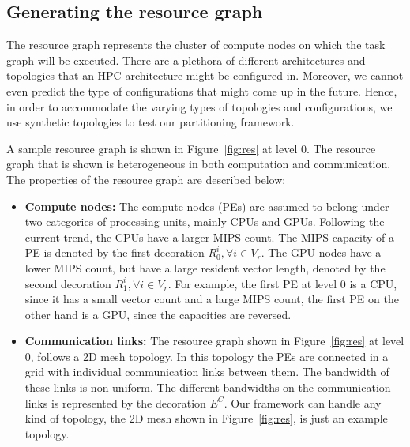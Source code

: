 \subsection{Generating the resource graph}
\label{sec:gener-reso-graph}

The resource graph represents the cluster of compute nodes on which the
task graph will be executed. There are a plethora of different
architectures and topologies that an HPC architecture might be
configured in. Moreover, we cannot even predict the type of
configurations that might come up in the future. Hence, in order to
accommodate the varying types of topologies and configurations, we use
synthetic topologies to test our partitioning framework.

A sample resource graph is shown in Figure~\ref{fig:res} at level 0. The
resource graph that is shown is heterogeneous in both computation and
communication. The properties of the resource graph are described below:

\begin{itemize}

\item \textbf{Compute nodes:} The compute nodes (PEs) are assumed to
  belong under two categories of processing units, mainly CPUs and
  GPUs. Following the current trend, the CPUs have a larger MIPS
  count. The MIPS capacity of a PE is denoted by the first decoration
  $R^i_0, \forall i \in V_r$. The GPU nodes have a lower MIPS count, but
  have a large resident vector length, denoted by the second decoration
  $R^i_1, \forall i \in V_r$. For example, the first PE at level 0 is a
  CPU, since it has a small vector count and a large MIPS count, the
  first PE on the other hand is a GPU, since the capacities are
  reversed.



\item \textbf{Communication links:} The resource graph shown in
  Figure~\ref{fig:res} at level 0, follows a 2D mesh topology. In this
  topology the PEs are connected in a grid with individual communication
  links between them. The bandwidth of these links is non uniform. The
  different bandwidths on the communication links is represented by the
  decoration $E^C$. Our framework can handle any kind of topology, the
  2D mesh shown in Figure~\ref{fig:res}, is just an example topology.

\end{itemize}

